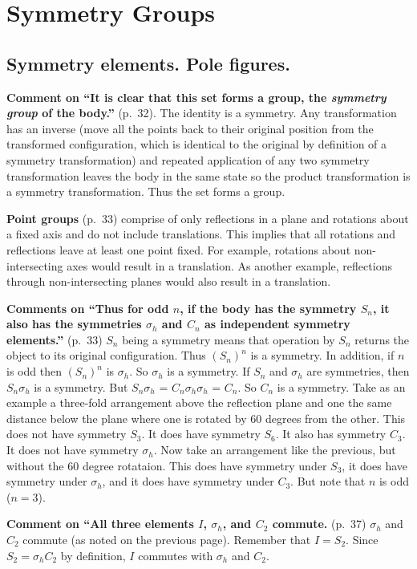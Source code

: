 \chapter{Symmetry Groups}

\section{Symmetry elements. Pole figures.}

{\bf Comment on ``It is clear that this set forms a group, the {\it
    symmetry group} of the body.''} (p.\ 32). The identity is a
symmetry. Any transformation has an inverse (move all the points back
to their original position from the transformed configuration, which
is identical to the original by definition of a symmetry
transformation) and repeated application of any two symmetry
transformation leaves the body in the same state so the product
transformation is a symmetry transformation. Thus the set forms a
group.

{\bf Point groups} (p.\ 33) comprise of only reflections in a plane and
rotations about a fixed axis and do not include translations. This
implies that all rotations and reflections leave at least one point
fixed. For example, rotations about non-intersecting axes would result
in a translation. As another example, reflections through
non-intersecting planes would also result in a translation.

{\bf Comments on ``Thus for odd $n$, if the body has the symmetry
  $S_n$, it also has the symmetries $\sigma_h$ and $C_n$ as
  independent symmetry elements.''} (p.\ 33) $S_n$ being a symmetry
means that operation by $S_n$ returns the object to its original
configuration. Thus $(S_n)^n$ is a symmetry. In addition, if $n$ is
odd then $(S_n)^n$ is $\sigma_h$. So $\sigma_h$ is a symmetry. If
$S_n$ and $\sigma_h$ are symmetries, then $S_n\sigma_h$ is a symmetry.
But $S_n\sigma_h$ = $C_n\sigma_h\sigma_h$ = $C_n$. So $C_n$ is a
symmetry. Take as an example a three-fold
arrangement above the reflection plane and one the same distance below
the plane where one is rotated by 60 degrees from the other.  This
does not have symmetry $S_3$. It does have symmetry $S_6$. It also has
symmetry $C_3$. It does not have symmetry $\sigma_h$.  Now take an
arrangement like the previous, but without the 60 degree
rotataion. This does have symmetry under $S_3$, it does have symmetry
under $\sigma_h$, and it does have symmetry under $C_3$. But note that
$n$ is odd ($n = 3$).

{\bf Comment on ``All three elements $I$, $\sigma_h$, and $C_2$
  commute.} (p.\ 37) $\sigma_h$ and $C_2$ commute (as noted on the
previous page). Remember that $I = S_2$. Since $S_2 = \sigma_h C_2$ by
definition, $I$ commutes with $\sigma_h$ and $C_2$.

